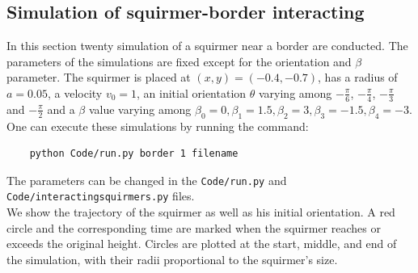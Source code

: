 \documentclass{article}
\begin{document}
\subsection{Simulation of squirmer-border interacting}
In this section twenty simulation of a squirmer near a border are conducted. The parameters of the simulations are fixed
except for the orientation and $\beta$ parameter. The squirmer is placed at $(x,y) = (-0.4,-0.7)$, has a radius of $a=0.05$,
a velocity $v_0=1$, an initial orientation $\theta$ varying among $-\frac{\pi}{6}$, $-\frac{\pi}{4}$, $-\frac{\pi}{3}$
and $-\frac{\pi}{2}$ and a $\beta$ value varying among $\beta_0 = 0, \beta_1 = 1.5, \beta_2 = 3, \beta_3 = -1.5, \beta_4 = -3$.\\
One can execute these simulations by running the command:
 \begin{verbatim}
    python Code/run.py border 1 filename
 \end{verbatim}
 The parameters can be changed in the \texttt{Code/run.py} and \texttt{Code/interactingsquirmers.py} files.\\
 We show the trajectory of the squirmer as well as his initial orientation. A red circle and the corresponding time are marked when the squirmer
 reaches or exceeds the original height. Circles are plotted at the start, 
 middle, and end of the simulation, with their radii proportional to the squirmer's size.
\end{document}
